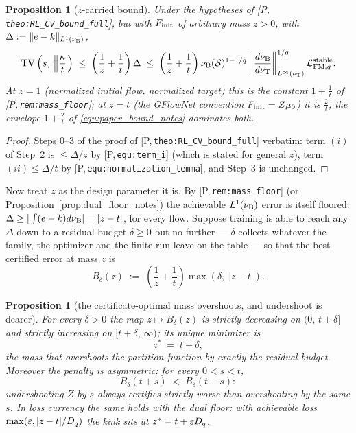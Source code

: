 \documentclass[11pt]{article}
\newtheorem{proposition}[theorem]{Proposition}
\theoremstyle{definition}
\theoremstyle{remark}
\newcommand{\paperref}[1]{[P,\,\texttt{#1}]}   %
\begin{document}
\begin{proposition}[$z$-carried bound]\label{prop:z_bound_notes}
Under the hypotheses of \paperref{theo:RL\_CV\_bound\_full}, but with $F_{\mathrm{init}}$ of arbitrary
mass $z>0$, with $\Delta:=\|e-k\|_{L^1(\nu_{\mathrm{B}})}$,
\begin{equation}\label{equ:z_bound_notes}
    \mathrm{TV}\left(s_\tau\left\|\frac{\kappa}{t}\right.\right)\;\leq\;
    \left(\frac1z+\frac1t\right)\Delta\;\leq\;
    \left(\frac1z+\frac1t\right)
    \nu_{\mathrm{B}}(\mathcal S)^{1-1/q}\left\|\frac{d\nu_{\mathrm{B}}}{d\nu_{\mathrm{T}}}\right\|^{1/q}_{L^\infty(\nu_{\mathrm{T}})}\mathcal L_{\mathrm{FM},q}^{\mathrm{stable}} .
\end{equation}
At $z=1$ (normalized initial flow, normalized target) this is the constant
$1+\frac1t$ of \paperref{rem:mass\_floor}; at $z=t$ (the GFlowNet convention
$F_{\mathrm{init}}=Z\mu_0$) it is $\frac2t$; the envelope $1+\frac2t$ of \eqref{equ:paper_bound_notes}
dominates both.
\end{proposition}

\begin{proof}
Steps 0--3 of the proof of \paperref{theo:RL\_CV\_bound\_full} verbatim: term $(i)$ of
Step~2 is $\leq\Delta/z$ by \paperref{equ:term\_i} (which is stated for general $z$), term
$(ii)\leq\Delta/t$ by \paperref{equ:normalization\_lemma}, and Step~3 is unchanged.
\end{proof}

Now treat $z$ as the design parameter it is. By \paperref{rem:mass\_floor} (or
Proposition~\ref{prop:dual_floor_notes}) the achievable $L^1(\nu_{\mathrm{B}})$ error is itself floored:
$\Delta\geq|\int(e-k)d\nu_{\mathrm{B}}|=|z-t|$, for every flow. Suppose training is able to reach
any $\Delta$ down to a residual budget $\delta\geq0$ but no further --- $\delta$ collects
whatever the family, the optimizer and the finite run leave on the table --- so that the
best certified error at mass $z$ is
\begin{equation}\label{equ:envelope_notes}
    B_\delta(z)\;:=\;\left(\frac1z+\frac1t\right)\max\left(\delta,\;|z-t|\right).
\end{equation}

\begin{proposition}[the certificate-optimal mass overshoots, and undershoot is dearer]
\label{prop:overshoot_notes}
For every $\delta>0$ the map $z\mapsto B_\delta(z)$ is strictly decreasing on
$(0,\,t+\delta]$ and strictly increasing on $[t+\delta,\,\infty)$; its unique minimizer is
\begin{equation}\label{equ:zstar_notes}
    z^*\;=\;t+\delta ,
\end{equation}
the mass that \emph{overshoots} the partition function by exactly the residual budget.
Moreover the penalty is asymmetric: for every $0<s<t$,
\begin{equation}\label{equ:asymmetry_notes}
    B_\delta(t+s)\;<\;B_\delta(t-s):
\end{equation}
undershooting $Z$ by $s$ always certifies strictly worse than overshooting by the same
$s$. In loss currency the same holds with the dual floor: with achievable loss
$\max(\varepsilon,|z-t|/D_{q})$ the kink sits at $z^*=t+\varepsilon D_{q}$.
\end{proposition}
\end{document}
